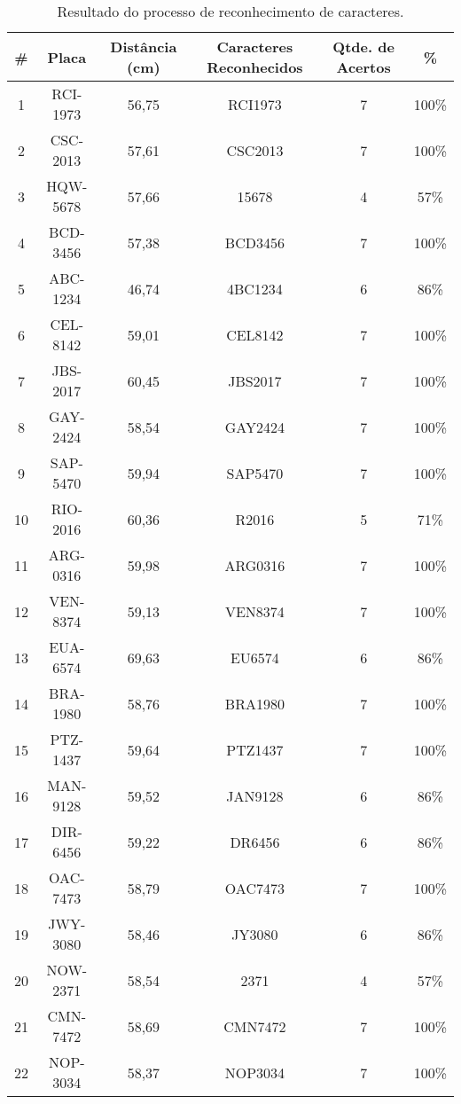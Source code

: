 \begin{table}[htb]
	\ABNTEXfontereduzida
	\caption[\footnotesize Resultado do processo de reconhecimento de caracteres.]{\footnotesize Resultado do processo de reconhecimento de caracteres.}
	\label{tab:results}
	\begin{tabular}{c|c|c|c|c|c}
		\hline
		\textbf{\#} & \textbf{Placa} & \textbf{Distância (cm)} & \textbf{Caracteres Reconhecidos} & \textbf{Qtde. de Acertos} & \textbf{\%} \\
		\hline \hline
		1 & RCI-1973 & 56,75 & RCI1973 & 7 & 100\% \\
		\hline
		2 & CSC-2013 & 57,61 & CSC2013 & 7 & 100\% \\
		\hline
		3 & HQW-5678 & 57,66 & 15678 & 4 & 57\% \\
		\hline
		4 & BCD-3456 & 57,38 & BCD3456 & 7 & 100\% \\
		\hline
		5 & ABC-1234 & 46,74 & 4BC1234 & 6 & 86\% \\
		\hline
		6 & CEL-8142 & 59,01 & CEL8142 & 7 & 100\% \\
		\hline
		7 & JBS-2017 & 60,45 & JBS2017 & 7 & 100\% \\
		\hline
		8 & GAY-2424 & 58,54 & GAY2424 & 7 & 100\% \\
		\hline
		9 & SAP-5470 & 59,94 & SAP5470 & 7 & 100\% \\
		\hline
		10 & RIO-2016 & 60,36 & R2016 & 5 & 71\% \\
		\hline
		11 & ARG-0316 & 59,98 & ARG0316 & 7 & 100\% \\
		\hline
		12 & VEN-8374 & 59,13 & VEN8374 & 7 & 100\% \\
		\hline
		13 & EUA-6574 & 69,63 & EU6574 & 6 & 86\% \\
		\hline
		14 & BRA-1980 & 58,76 & BRA1980 & 7 & 100\% \\
		\hline
		15 & PTZ-1437 & 59,64 & PTZ1437 & 7 & 100\% \\
		\hline
		16 & MAN-9128 & 59,52 & JAN9128 & 6 & 86\% \\
		\hline
		17 & DIR-6456 & 59,22 & DR6456 & 6 & 86\% \\
		\hline
		18 & OAC-7473 & 58,79 & OAC7473 & 7 & 100\% \\
		\hline
		19 & JWY-3080 & 58,46 & JY3080 & 6 & 86\% \\
		\hline
		20 & NOW-2371 & 58,54 & 2371 & 4 & 57\% \\
		\hline
		21 & CMN-7472 & 58,69 & CMN7472 & 7 & 100\% \\
		\hline
		22 & NOP-3034 & 58,37 & NOP3034 & 7 & 100\% \\

\end{tabular}
\end{table}
